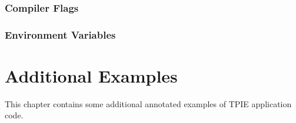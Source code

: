 
\subsection{Compiler Flags}
\label{sec:comp-flags}


\subsection{Environment Variables}






\chapter{Additional Examples} \label{ch:examples}

This chapter contains some additional annotated examples of 
TPIE application code.

